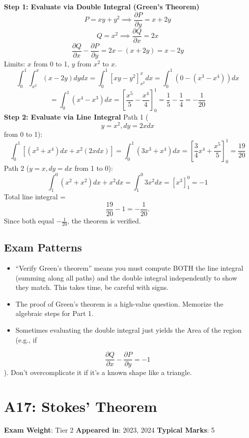 \documentclass[
]{article}
\providecommand{\tightlist}{%
  \setlength{\itemsep}{0pt}\setlength{\parskip}{0pt}}
\renewenvironment{quote}
  {\begin{tcolorbox}[
     colback=calloutbg,
     colframe=calloutframe,
     colupper=callouttext,
     arc=3pt,
     boxrule=0.5pt,
     leftrule=0.5pt,
     borderline west={3pt}{0pt}{calloutaccent},
     left=8pt,
     right=8pt,
     top=6pt,
     bottom=6pt
   ]}
  {\end{tcolorbox}}
\begin{document}
\textbf{Step 1: Evaluate via Double Integral (Green's Theorem)}
\[
P = xy + y^2 \implies \frac{\partial P}{\partial y} = x + 2y
\]
\[
Q = x^2 \implies \frac{\partial Q}{\partial x} = 2x
\]
\[
\frac{\partial Q}{\partial x} - \frac{\partial P}{\partial y} = 2x - (x + 2y) = x - 2y
\]
Limits: \(x\) from 0 to 1, \(y\) from \(x^2\) to \(x\).
\[
\int_0^1 \int_{x^2}^x (x - 2y) dy dx = \int_0^1 \left[ xy - y^2 \right]_{x^2}^x dx = \int_0^1 (0 - (x^3 - x^4)) dx
\]
\[
= \int_0^1 (x^4 - x^3) dx = \left[ \frac{x^5}{5} - \frac{x^4}{4} \right]_0^1 = \frac{1}{5} - \frac{1}{4} = -\frac{1}{20}
\]
\textbf{Step 2: Evaluate via Line Integral} Path 1 (
\[
y = x^2, dy = 2xdx
\]
from 0 to 1):
\[
\int_0^1 \left[ (x^3 + x^4)dx + x^2(2x dx) \right] = \int_0^1 (3x^3 + x^4) dx = \left[ \frac{3}{4}x^4 + \frac{x^5}{5} \right]_0^1 = \frac{19}{20}
\]
Path 2 (\(y = x, dy = dx\) from 1 to 0):
\[
\int_1^0 (x^2 + x^2)dx + x^2 dx = \int_1^0 3x^2 dx = [x^3]_1^0 = -1
\]
Total line integral =
\[
\frac{19}{20} - 1 = -\frac{1}{20}.
\]
Since both equal \(-\frac{1}{20}\), the theorem is verified.

\subsection{Exam Patterns}\label{exam-patterns-14}

\begin{itemize}
\tightlist
\item
  ``Verify Green's theorem'' means you must compute BOTH the line
  integral (summing along all paths) and the double integral
  independently to show they match. This takes time, be careful with
  signs.
\item
  The proof of Green's theorem is a high-value question. Memorize the
  algebraic steps for Part 1.
\item
  Sometimes evaluating the double integral just yields the Area of the
  region (e.g., if
\end{itemize}
\[
\frac{\partial Q}{\partial x} - \frac{\partial P}{\partial y} = -1
\]
). Don't overcomplicate it if it's a known shape like a triangle.

\section{A17: Stokes' Theorem}\label{a17-stokes-theorem}

\begin{quote}
\textbf{Exam Weight}: Tier 2 \textbar{} \textbf{Appeared in}: 2023, 2024
\textbar{} \textbf{Typical Marks}: 5
\end{quote}
\end{document}
